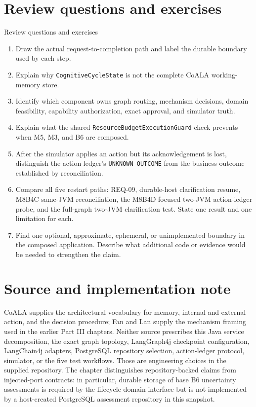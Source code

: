 \clearpage
\section{Review questions and exercises}
\begin{reviewquestions}{Review questions and exercises}
\begin{enumerate}
  \item Draw the actual request-to-completion path and label the durable boundary used by each step.
  \item Explain why \texttt{CognitiveCycleState} is not the complete CoALA working-memory store.
  \item Identify which component owns graph routing, mechanism decisions, domain feasibility, capability authorization, exact approval, and simulator truth.
  \item Explain what the shared \texttt{ResourceBudgetExecutionGuard} check prevents when M5, M3, and B6 are composed.
  \item After the simulator applies an action but its acknowledgement is lost, distinguish the action ledger's \texttt{UNKNOWN\_OUTCOME} from the business outcome established by reconciliation.
  \item Compare all five restart paths: REQ-09, durable-host clarification resume, M8B4C same-JVM reconciliation, the M8B4D focused two-JVM action-ledger probe, and the full-graph two-JVM clarification test. State one result and one limitation for each.
  \item Find one optional, approximate, ephemeral, or unimplemented boundary in the composed application. Describe what additional code or evidence would be needed to strengthen the claim.
\end{enumerate}
\end{reviewquestions}

\section*{Source and implementation note}

CoALA supplies the architectural vocabulary for memory, internal and external action, and the decision procedure; Fan and Lan supply the mechanism framing used in the earlier Part III chapters. Neither source prescribes this Java service decomposition, the exact graph topology, LangGraph4j checkpoint configuration, LangChain4j adapters, PostgreSQL repository selection, action-ledger protocol, simulator, or the five test workflows. Those are engineering choices in the supplied repository. The chapter distinguishes repository-backed claims from injected-port contracts: in particular, durable storage of base B6 uncertainty assessments is required by the lifecycle-domain interface but is not implemented by a host-created PostgreSQL assessment repository in this snapshot.

